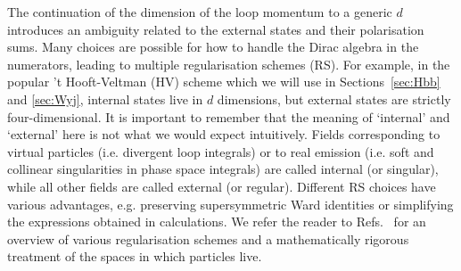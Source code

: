 \documentclass[main.tex]{subfiles}
\begin{document}
The continuation of the dimension of the loop momentum to a generic $d$ introduces an ambiguity related to the external states and their polarisation sums. Many choices are possible for how to handle the Dirac algebra in the numerators, leading to multiple regularisation schemes (RS). For example, in the popular 't Hooft-Veltman (HV) scheme which we will use in Sections~\ref{sec:Hbb} and \ref{sec:Wyj}, internal states live in $d$ dimensions, but external states are strictly four-dimensional. It is important to remember that the meaning of `internal' and `external' here is not what we would expect intuitively. Fields corresponding to virtual particles (i.e. divergent loop integrals) or to real emission (i.e. soft and collinear singularities in phase space integrals) are called internal (or singular), while all other fields are called external (or regular). Different RS choices have various advantages, e.g. preserving supersymmetric Ward identities or simplifying the expressions obtained in calculations. We refer the reader to Refs.~\cite{Signer:2008va, Gnendiger:2017pys} for an overview of various regularisation schemes and a mathematically rigorous treatment of the spaces in which particles live.

%
\end{document}
